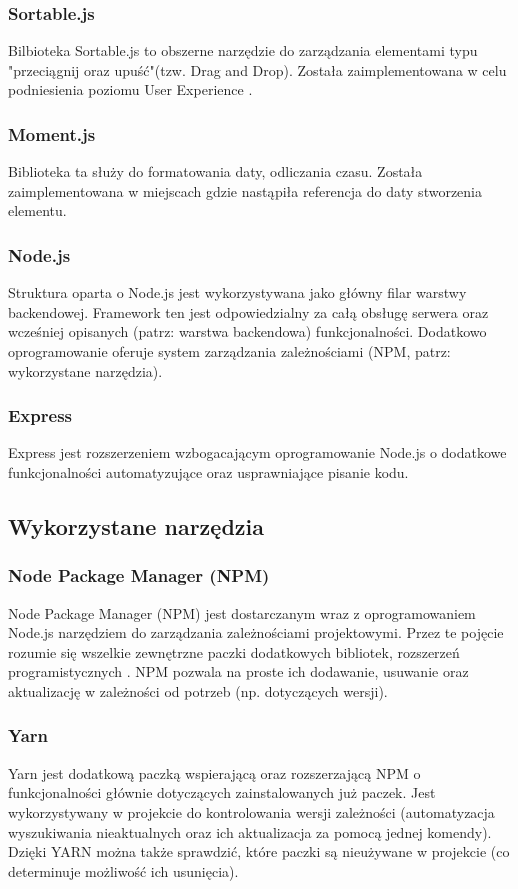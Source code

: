 \documentclass[eng,printmode]{mgr}
\begin{document}
\subsubsection{Sortable.js}
Bilbioteka Sortable.js \cite{Sortable} to obszerne narzędzie do zarządzania elementami typu "przeciągnij oraz upuść"(tzw. Drag and Drop). Została zaimplementowana w celu podniesienia poziomu User Experience \cite {UX}.

\subsubsection{Moment.js}
Biblioteka ta \cite {Moment} służy do formatowania daty, odliczania czasu. Została zaimplementowana w miejscach gdzie nastąpiła referencja do daty stworzenia elementu.

\subsubsection{Node.js}
Struktura oparta o Node.js \cite {Node.js} jest wykorzystywana jako główny filar warstwy backendowej. Framework ten jest odpowiedzialny za całą obsługę serwera oraz wcześniej opisanych (patrz: warstwa backendowa) funkcjonalności. Dodatkowo oprogramowanie oferuje system zarządzania zależnościami (NPM, patrz: wykorzystane narzędzia).

\subsubsection{Express}
Express \cite {Express} jest rozszerzeniem wzbogacającym oprogramowanie Node.js o dodatkowe funkcjonalności automatyzujące oraz usprawniające pisanie kodu.
\subsection{Wykorzystane narzędzia}

\subsubsection{Node Package Manager (NPM)}
Node Package Manager (NPM) \cite {NPM} jest dostarczanym wraz z oprogramowaniem Node.js narzędziem do zarządzania zależnościami projektowymi. Przez te pojęcie rozumie się wszelkie zewnętrzne paczki dodatkowych bibliotek, rozszerzeń programistycznych . NPM pozwala na proste ich dodawanie, usuwanie oraz aktualizację w zależności od potrzeb (np. dotyczących wersji).

\subsubsection{Yarn}
Yarn \cite {YARN} jest dodatkową paczką wspierającą oraz rozszerzającą NPM o funkcjonalności głównie dotyczących  zainstalowanych już paczek. Jest wykorzystywany w projekcie do kontrolowania wersji zależności (automatyzacja wyszukiwania nieaktualnych oraz ich aktualizacja za pomocą jednej komendy). Dzięki YARN można także sprawdzić, które paczki są nieużywane w projekcie (co determinuje możliwość ich usunięcia).
\end{document}
